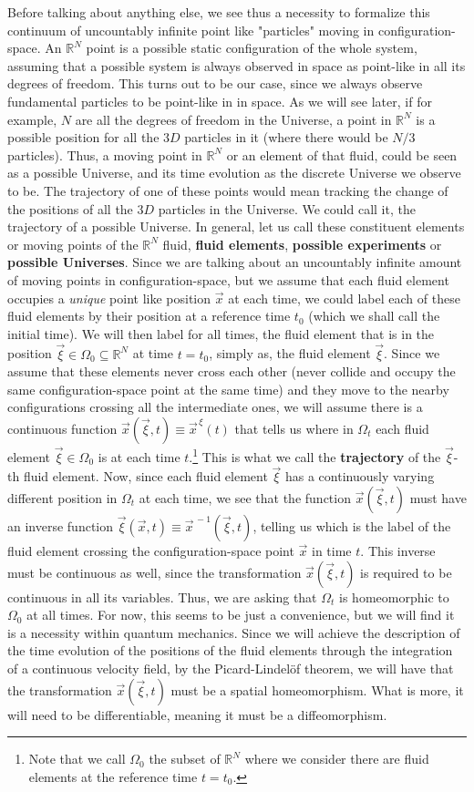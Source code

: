 \documentclass[11pt, a4paper]{article} %
\newcommand{\R}{\mathbb{R}} %
\begin{document}
Before talking about anything else, we see thus a necessity to formalize this continuum of uncountably infinite point like "particles" moving in configuration-space. An $\R^N$ point is a possible static configuration of the whole system, assuming that a possible system is always observed in space as point-like in all its degrees of freedom. This turns out to be our case, since we always observe fundamental particles to be point-like in in space. As we will see later, if for example, $N$ are all the degrees of freedom in the Universe, a point in $\R^N$ is a possible position for all the $3D$ particles in it (where there would be $N/3$ particles). Thus, a moving point in $\R^N$ or an element of that fluid, could be seen as a possible Universe, and its time evolution as the discrete Universe  we observe to be. The trajectory of one of these points would mean tracking the change of the positions of all the $3D$ particles in the Universe. We could call it, the trajectory of a possible Universe. In general, let us call these constituent elements or moving points of the $\R^N$ fluid, {\bf fluid elements}, {\bf possible experiments} or {\bf possible Universes}. Since we are talking about an uncountably infinite amount of moving points in configuration-space, but we assume that each fluid element occupies a {\em unique} point like position $\vec{x}$ at each time, we could label each of these fluid elements by their position at a reference time $t_0$ (which we shall call the initial time). We will then label for all times, the fluid element that is in the position $\vec{\xi}\in\Omega_0\subseteq \R^N$ at time $t=t_0$, simply as, the fluid element $\vec{\xi}$. Since we assume that these elements never cross each other (never collide and occupy the same configuration-space point at the same time) and they move to the nearby configurations crossing all the intermediate ones, we will assume there is a continuous function $\vec{x}(\vec{\xi},t)\equiv \vec{x}^{\, \xi}(t)$ that tells us where in $\Omega_t$ each fluid element $\vec{\xi}\in\Omega_0$ is at each time $t$.\footnote{Note that we call $\Omega_0$ the subset of $\R^N$ where we consider there are fluid elements at the reference time $t=t_0$. } This is what we call the {\bf trajectory} of the $\vec{\xi}$-th fluid element. Now, since each fluid element $\vec{\xi}$ has a continuously varying different position in $\Omega_t$ at each time, we see that the function $\vec{x}(\vec{\xi},t)$ must have an inverse function $\vec{\xi}(\vec{x},t)\equiv \vec{x}^{\, -1}(\vec{\xi},t)$, telling us which is the label of the fluid element crossing the configuration-space point $\vec{x}$ in time $t$. This inverse must be continuous as well, since the transformation $\vec{x}(\vec{\xi},t)$ is required to be continuous in all its variables. Thus, we are asking that $\Omega_t$ is homeomorphic to $\Omega_0$ at all times. For now, this seems to be just a convenience, but we will find it is a necessity within quantum mechanics. Since we will achieve the description of the time evolution of the positions of the fluid elements through the integration of a continuous velocity field, by the Picard-Lindelöf theorem, we will have that the transformation $\vec{x}(\vec{\xi},t)$ must be a spatial homeomorphism. What is more, it will need to be differentiable, meaning it must be a diffeomorphism.
\end{document}
